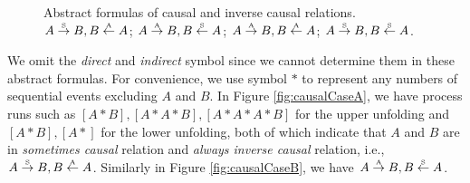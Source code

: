 \documentclass{llncs}
\begin{document}
\begin{figure}[htbp]
{\begin{minipage}[b]{0.45\textwidth}
	\end{minipage}
	\label{fig:causalCaseB}
}
\caption{Abstract formulas of causal and inverse causal relations.  $A\overset{\text{\tiny{S}}}{\rightarrow} B, B\overset{\text{\tiny{A}}}{\leftarrow} A$;  $A\overset{\text{\tiny{A}}}{\rightarrow} B, B\overset{\text{\tiny{S}}}{\leftarrow} A$;  $A\overset{\text{\tiny{A}}}{\rightarrow} B, B\overset{\text{\tiny{A}}}{\leftarrow} A$;  $A\overset{\text{\tiny{S}}}{\rightarrow} B, B\overset{\text{\tiny{S}}}{\leftarrow} A$.\label{fig:causalCases}}
\end{figure}

We omit the \textit{direct} and \textit{indirect} symbol since we cannot determine them in these abstract formulas. For convenience, we use symbol $*$ to represent any numbers of sequential events excluding $A$ and $B$. In Figure \ref{fig:causalCaseA}, we have process runs such as $[A*B],[A*A*B],[A*A*A*B]$ for the upper unfolding and $[A*B],[A*]$ for the lower unfolding, both of which indicate that $A$ and $B$ are in \textit{sometimes causal} relation and \textit{always inverse causal} relation, i.e., $A\overset{\text{\tiny{S}}}{\rightarrow} B,B\overset{\text{\tiny{A}}}{\leftarrow} A$. Similarly in Figure \ref{fig:causalCaseB}, we have $A\overset{\text{\tiny{A}}}{\rightarrow} B,B\overset{\text{\tiny{S}}}{\leftarrow} A$.
\end{document}
